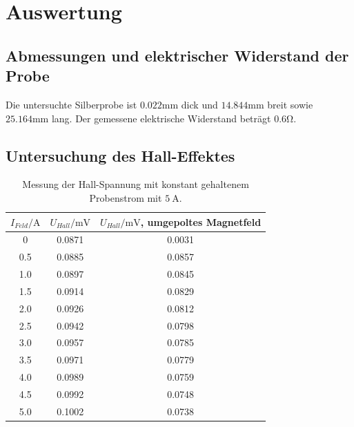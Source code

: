 \section{Auswertung}
  \subsection{Abmessungen und elektrischer Widerstand der Probe}
    Die untersuchte Silberprobe ist $0.022 \si{\milli\meter}$ dick und $14.844 \si{\milli\meter}$ breit sowie
    $25.164\si{\milli\meter}$ lang. Der gemessene elektrische Widerstand beträgt $0.6 \si{\ohm}$.
  \subsection{Untersuchung des Hall-Effektes}
  
    \begin{table}[H]
      \centering
        \caption{Messung der Hall-Spannung mit konstant gehaltenem Probenstrom mit $\SI{5}{\ampere}$.}
        \label{tab:hallspannung1}
        \begin{tabular}{S S S }
          \toprule
          {$I_{Feld} /\si{\ampere}$} & {$U_{Hall} /\si{\milli\volt}$} & {$U_{Hall} / \si{\milli\volt}$, umgepoltes Magnetfeld} \\
             & 0.0871 & 0.0031 \\
          0.5 & 0.0885 & 0.0857 \\
          1.0 & 0.0897 & 0.0845 \\
          1.5 & 0.0914 & 0.0829 \\
          2.0 & 0.0926 & 0.0812 \\
          2.5 & 0.0942 & 0.0798 \\
          3.0 & 0.0957 & 0.0785 \\
          3.5 & 0.0971 & 0.0779 \\
          4.0 & 0.0989 & 0.0759 \\
          4.5 & 0.0992 & 0.0748 \\
          5.0 & 0.1002 & 0.0738 \\
          \bottomrule
        \end{tabular}
      \end{table}
